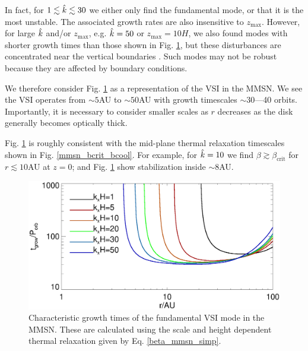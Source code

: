 In fact, for $1\lesssim \hat{k} \lesssim 30$ we either only find the
fundamental mode, or that it is the most unstable. The associated 
growth rates are also insensitive to $z_\mathrm{max}$. However, for
large $\hat{k}$ and/or $z_\mathrm{max}$, e.g. $\hat{k}=50$ or 
$z_\mathrm{max}=10H$, we also found modes with shorter growth times 
than those shown in Fig. \ref{mmsn_overall}, but these disturbances are 
concentrated near the vertical boundaries
\citep{nelson13,mcnally14}. Such modes may not be robust because    
they are affected by boundary conditions. %

We therefore consider Fig. \ref{mmsn_overall} as a representation of the
VSI in the MMSN. We see the VSI operates from $\sim 5$AU to $\sim
50$AU with growth timescales $\sim 30$---40 orbits. 
Importantly, it is necessary to consider smaller scales as $r$
decreases as the disk generally becomes optically thick. 

Fig. \ref{mmsn_overall} is roughly consistent with the 
mid-plane thermal relaxation timescales shown in
Fig. \ref{mmsn_bcrit_bcool}. For example, for $\hat{k}=10$ we find 
$\beta \gtrsim \beta_\mathrm{crit}$ for $r\lesssim 10$AU at $z=0$; and
Fig. \ref{mmsn_overall} show stabilization inside $\sim 8$AU. 


\begin{figure}
  \includegraphics[width=\linewidth]{figures/eigen_compare_grow.ps}
  \caption{Characteristic growth times of the fundamental VSI mode in
    the MMSN. These are calculated using the scale and height
    dependent thermal relaxation given by Eq. \ref{beta_mmsn_simp}. 
    \label{mmsn_overall}}    
\end{figure}

